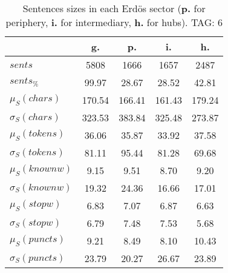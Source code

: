 \begin{table}[h!]
\begin{center}
\begin{tabular}{| l || c | c | c | c |}\hline
 & {\bf g.} & {\bf p.} & {\bf i.} & {\bf h.} \\\hline\hline
$sents$ & 5808  & 1666  & 1657  & 2487 \\
$sents_{\%}$ & 99.97  & 28.67  & 28.52  & 42.81 \\\hline
$\mu_S(chars)$ & 170.54  & 166.41  & 161.43  & 179.24 \\
$\sigma_S(chars)$ & 323.53  & 383.84  & 325.48  & 273.87 \\\hline
$\mu_S(tokens)$ & 36.06  & 35.87  & 33.92  & 37.58 \\
$\sigma_S(tokens)$ & 81.11  & 95.44  & 81.28  & 69.68 \\\hline
$\mu_S(knownw)$ & 9.15  & 9.51  & 8.70  & 9.20 \\
$\sigma_S(knownw)$ & 19.32  & 24.36  & 16.66  & 17.01 \\\hline
$\mu_S(stopw)$ & 6.83  & 7.07  & 6.87  & 6.63 \\
$\sigma_S(stopw)$ & 6.79  & 7.48  & 7.53  & 5.68 \\\hline
$\mu_S(puncts)$ & 9.21  & 8.49  & 8.10  & 10.43 \\
$\sigma_S(puncts)$ & 23.79  & 20.27  & 26.67  & 23.89 \\\hline
\end{tabular}
\caption{Sentences sizes in each Erd\"os sector ({{\bf p.}} for periphery, {{\bf i.}} for intermediary, {{\bf h.}} for hubs). TAG: 6}
\end{center}
\end{table}